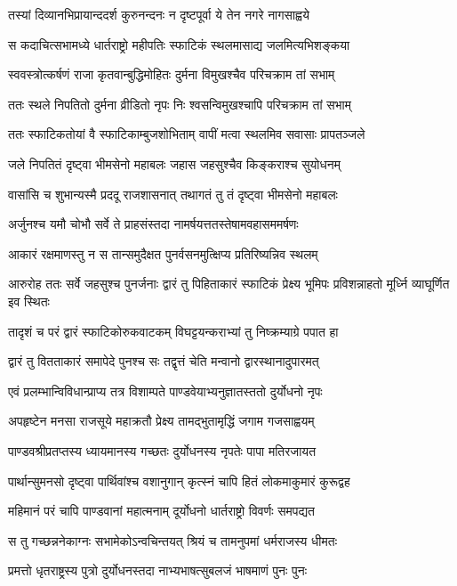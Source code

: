 \twolineshloka
{तस्यां दिव्यानभिप्रायान्ददर्श कुरुनन्दनः}
{न दृष्टपूर्वा ये तेन नगरे नागसाह्वये}


\twolineshloka
{स कदाचित्सभामध्ये धार्तराष्ट्रो महीपतिः}
{स्फाटिकं स्थलमासाद्य जलमित्यभिशङ्कया}


\twolineshloka
{स्ववस्त्रोत्कर्षणं राजा कृतवान्बुद्धिमोहितः}
{दुर्मना विमुखश्चैव परिचक्राम तां सभाम्}


\twolineshloka
{ततः स्थले निपतितो दुर्मना व्रीडितो नृपः}
{निः श्वसन्विमुखश्चापि परिचक्राम तां सभाम्}


\twolineshloka
{ततः स्फाटिकतोयां वै स्फाटिकाम्बुजशोभिताम्}
{वापीं मत्वा स्थलमिव सवासाः प्रापतञ्जले}


\twolineshloka
{जले निपतितं दृष्ट्वा भीमसेनो महाबलः}
{जहास जहसुश्चैव किङ्कराश्च सुयोधनम्}


\twolineshloka
{वासांसि च शुभान्यस्मै प्रददू राजशासनात्}
{तथागतं तु तं दृष्ट्वा भीमसेनो महाबलः}


\twolineshloka
{अर्जुनश्च यमौ चोभौ सर्वे ते प्राहसंस्तदा}
{नामर्षयत्ततस्तेषामवहासममर्षणः}


\twolineshloka
{आकारं रक्षमाणस्तु न स तान्समुदैक्षत}
{पुनर्वसनमुत्क्षिप्य प्रतिरिष्यन्निव स्थलम्}


\threelineshloka
{आरुरोह ततः सर्वे जहसुश्च पुनर्जनाः}
{द्वारं तु पिहिताकारं स्फाटिकं प्रेक्ष्य भूमिपः}
{प्रविशन्नाहतो मूर्ध्नि व्याघूर्णित इव स्थितः}


\twolineshloka
{तादृशं च परं द्वारं स्फाटिकोरुकवाटकम्}
{विघट्टयन्कराभ्यां तु निष्क्रम्याग्रे पपात हा}


\twolineshloka
{द्वारं तु वितताकारं समापेदे पुनश्च सः}
{तद्वृत्तं चेति मन्वानो द्वारस्थानादुपारमत्}


\twolineshloka
{एवं प्रलम्भान्विविधान्प्राप्य तत्र विशाम्पते}
{पाण्डवेयाभ्यनुज्ञातस्ततो दुर्योधनो नृपः}


\twolineshloka
{अपहृष्टेन मनसा राजसूये महाक्रतौ}
{प्रेक्ष्य तामद्भुतामृद्धिं जगाम गजसाह्वयम्}


\twolineshloka
{पाण्डवश्रीप्रतप्तस्य ध्यायमानस्य गच्छतः}
{दुर्योधनस्य नृपतेः पापा मतिरजायत}


\twolineshloka
{पार्थान्सुमनसो दृष्ट्वा पार्थिवांश्च वशानुगान्}
{कृत्स्नं चापि हितं लोकमाकुमारं कुरूद्वह}


\twolineshloka
{महिमानं परं चापि पाण्डवानां महात्मनाम्}
{दूर्योधनो धार्तराष्ट्रो विवर्णः समपद्यत}


\twolineshloka
{स तु गच्छन्ननेकाग्नः सभामेकोऽन्वचिन्तयत्}
{श्रियं च तामनुपमां धर्मराजस्य धीमतः}


\twolineshloka
{प्रमत्तो धृतराष्ट्रस्य पुत्रो दुर्योधनस्तदा}
{नाभ्यभाषत्सुबलजं भाषमाणं पुनः पुनः}


